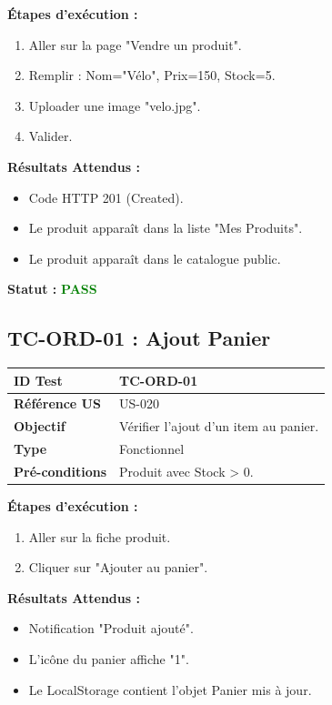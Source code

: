 \documentclass[12pt,a4paper]{article}
\begin{document}
\vspace{0.5cm}
\textbf{Étapes d'exécution :}
\begin{enumerate}
    \item Aller sur la page "Vendre un produit".
    \item Remplir : Nom="Vélo", Prix=150, Stock=5.
    \item Uploader une image "velo.jpg".
    \item Valider.
\end{enumerate}

\vspace{0.5cm}
\textbf{Résultats Attendus :}
\begin{itemize}
    \item Code HTTP 201 (Created).
    \item Le produit apparaît dans la liste "Mes Produits".
    \item Le produit apparaît dans le catalogue public.
\end{itemize}

\vspace{0.5cm}
\textbf{Statut :} \textcolor{green}{\textbf{PASS}}

\subsection{TC-ORD-01 : Ajout Panier}

\begin{tabular}{|l|p{10cm}|}
    \hline
    \textbf{ID Test} & TC-ORD-01 \\ \hline
    \textbf{Référence US} & US-020 \\ \hline
    \textbf{Objectif} & Vérifier l'ajout d'un item au panier. \\ \hline
    \textbf{Type} & Fonctionnel \\ \hline
    \textbf{Pré-conditions} & Produit avec Stock > 0. \\ \hline
\end{tabular}

\vspace{0.5cm}
\textbf{Étapes d'exécution :}
\begin{enumerate}
    \item Aller sur la fiche produit.
    \item Cliquer sur "Ajouter au panier".
\end{enumerate}

\vspace{0.5cm}
\textbf{Résultats Attendus :}
\begin{itemize}
    \item Notification "Produit ajouté".
    \item L'icône du panier affiche "1".
    \item Le LocalStorage contient l'objet Panier mis à jour.
\end{itemize}
\end{document}
